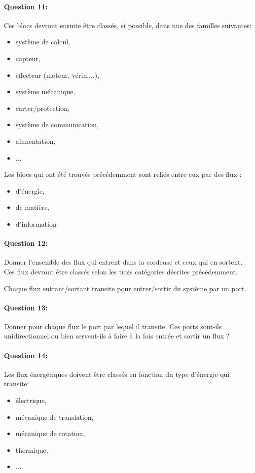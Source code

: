 \paragraph{Question 11:} Ces blocs devront ensuite être classés, si possible, dans une des familles suivantes:
\begin{itemize}
 \item système de calcul,
 \item capteur,
 \item effecteur (moteur, vérin,...),
 \item système mécanique,
 \item carter/protection,
 \item système de communication,
 \item alimentation,
 \item ...
\end{itemize}


Les blocs qui ont été trouvés précédemment sont reliés entre eux par des flux :
\begin{itemize}
 \item d'énergie,
 \item de matière,
 \item d'information
\end{itemize}

\paragraph{Question 12:} Donner l'ensemble des flux qui entrent dans la cordeuse et ceux qui en sortent. Ces flux devront être classés selon les trois catégories décrites précédemment.

Chaque flux entrant/sortant transite pour entrer/sortir du système par un port.

\paragraph{Question 13:} Donner pour chaque flux le port par lequel il transite. Ces ports sont-ils unidirectionnel ou bien servent-ils à faire à la fois entrée et sortir un flux ?

\paragraph{Question 14:} Les flux énergétiques doivent être classés en fonction du type d'énergie qui transite:
\begin{itemize}
 \item électrique,
 \item mécanique de translation,
 \item mécanique de rotation,
 \item thermique,
 \item ...
\end{itemize}

